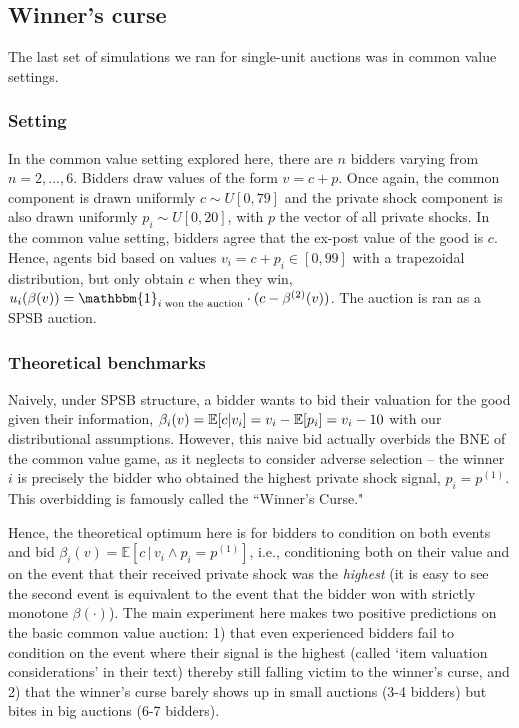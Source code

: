 \documentclass{article} %
\begin{document}
\subsection{Winner's curse}\label{session:winner}
The last set of simulations we ran for single-unit auctions was in common value settings. 

\subsubsection{Setting}
In the common value setting explored here, there are $n$ bidders varying from $n = 2, ..., 6$. 
Bidders draw values of the form $v = c + p$. Once again, the common component is drawn uniformly $c \sim U[0, 79]$ and the private shock component is also drawn uniformly $p_i \sim U[0, 20]$, with $p$ the vector of all private shocks. 
In the common value setting, bidders agree that the ex-post value of the good is $c$. 
Hence, agents bid based on values $v_i = c + p_i \in [0, 99]$ with a trapezoidal distribution, but only obtain $c$ when they win, $u_i(\beta(v)) = \mathbbm{1}_{i \; \text{won the auction}} \cdot (c - \beta^{(2)}(v))$. 
The auction is ran as a SPSB auction. 

\subsubsection{Theoretical benchmarks}
Naively, under SPSB structure, a bidder wants to bid their valuation for the good given their information, $\beta_i(v) = \mathbb{E}[c | v_i] = v_i - \mathbb{E}[p_i] = v_i - 10$ with our distributional assumptions. 
However, this naive bid actually overbids the BNE of the common value game, as it neglects to consider adverse selection -- the winner $i$ is precisely the bidder who obtained the highest private shock signal, $p_i = p^(1)$. 
This overbidding is famously called the ``Winner's Curse." 

Hence, the theoretical optimum here is for bidders to condition on both events and bid $\beta_i(v) = \mathbb{E}[c \, | \, v_i \wedge p_i = p^{(1)}]$, i.e., conditioning both on their value and on the event that their received private shock was the \textit{highest} (it is easy to see the second event is equivalent to the event that the bidder won with strictly monotone $\beta(\cdot)$). 
The main experiment here \cite{kagel1986winner} makes two positive predictions on the basic common value auction: 1) that even experienced bidders fail to condition on the event where their signal is the highest (called `item valuation considerations' in their text) thereby still falling victim to the winner's curse, and 2) that the winner's curse barely shows up in small auctions (3-4 bidders) but bites in big auctions (6-7 bidders).
\end{document}
